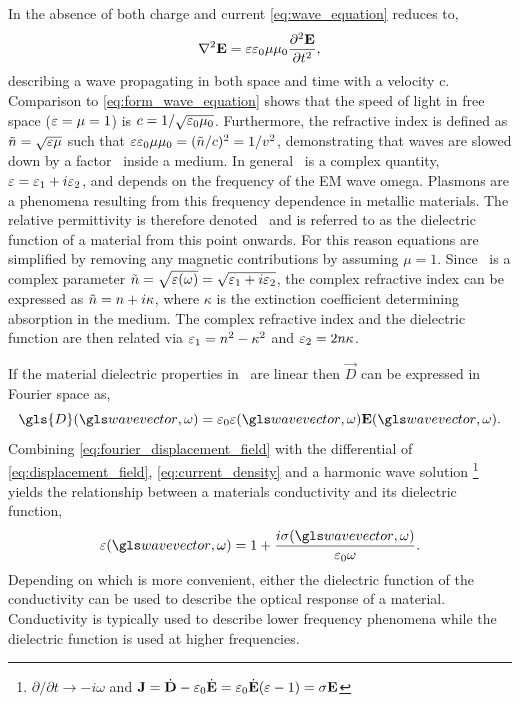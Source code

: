 \documentclass{article}
\begin{document}
In the absence of both charge and current \eqref{eq:wave_equation} reduces to,
\begin{equation}
\nabla^2\mathbf{E} = \varepsilon\varepsilon_0\mu\mu_0\frac{\partial^2\mathbf{E}}{\partial t^2},
\end{equation}
describing a wave propagating in both space and time with a velocity \gls{c}. Comparison to \eqref{eq:form_wave_equation} shows that the speed of light in free space ($\varepsilon=\mu=1$) is $c=1/\sqrt{\varepsilon_0\mu_0}$. Furthermore, the refractive index is defined as $\tilde{n}=\sqrt{\varepsilon\mu}$ such that $\varepsilon\varepsilon_0\mu\mu_0 = (\tilde{n}/c)^2 = 1/v^2$, demonstrating that waves are slowed down by a factor \ inside a medium.
In general \eps\ is a complex quantity, $\varepsilon=\varepsilon_1+i\varepsilon_2$, and depends on the frequency of the EM wave \gls{omega}. Plasmons are a phenomena resulting from this frequency dependence in metallic materials. The relative permittivity is therefore denoted \dielectric\ and is referred to as the dielectric function of a material from this point onwards. For this reason equations are simplified by removing any magnetic contributions by assuming $\mu=1$.
Since \dielectric\ is a complex parameter $\tilde{n}=\sqrt{\varepsilon(\omega)}=\sqrt{\varepsilon_1+i\varepsilon_2}$, the complex refractive index can be expressed as $\tilde{n}=n+i\kappa$, where $\kappa$ is the extinction coefficient determining absorption in the medium. The complex refractive index and the dielectric function are then related via $\varepsilon_1=n^2-\kappa^2$ and $\varepsilon_2 = 2n\kappa$.

If the material dielectric properties in \eps\ are linear then $\vec{D}$ can be expressed in Fourier space as,
\begin{equation}
\gls{D}(\wv, \omega) = \epsfs\eps(\wv, \omega)\vec{E}(\wv, \omega).
\label{eq:fourier_displacement_field}
\end{equation}
Combining \eqref{eq:fourier_displacement_field} with the differential of \eqref{eq:displacement_field}, \eqref{eq:current_density} and a harmonic wave solution%
\footnote{$\partial/\partial t \rightarrow -i\omega$ and $\mathbf{J}=\dot{\mathbf{D}}-\varepsilon_0\dot{\mathbf{E}}=\varepsilon_0\dot{\mathbf{E}}(\varepsilon-1)=\sigma\mathbf{E}$}
yields the relationship between a materials conductivity and its dielectric function,
\begin{equation}
\eps(\wv, \omega) = 1 + \frac{i\sigma(\wv, \omega)}{\epsfs\omega}.
\label{eq:dielectric_conductivity}
\end{equation}
Depending on which is more convenient, either the dielectric function of the conductivity can be used to describe the optical response of a material. Conductivity is typically used to describe lower frequency phenomena while the dielectric function is used at higher frequencies.
\end{document}
